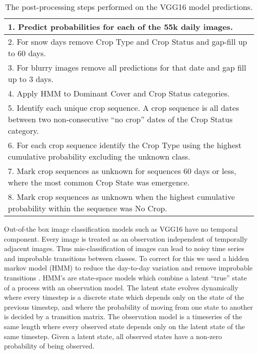 \documentclass[remotesensing,article,submit,moreauthors,pdftex]{Definitions/mdpi}
\begin{document}
\begin{table}[H]
\caption{The post-processing steps performed on the VGG16 model predictions.}
\centering
\begin{tabular}{|p{12cm}|}
\hline
1. Predict probabilities for each of the 55k daily images.                                                                                   \\ \hline
2. For snow days remove Crop Type and Crop Status and gap-fill up to 60 days.                                                                \\ \hline
3. For blurry images remove all predictions for that date and gap fill up to 3 days.                                                         \\ \hline
4. Apply HMM to Dominant Cover and Crop Status categories.                                                                                   \\ \hline
5. Identify each unique crop sequence. A crop sequence is all dates between two non-consecutive “no crop” dates of the Crop Status category. \\ \hline
6. For each crop sequence identify the Crop Type using the highest cumulative probability excluding the unknown class.                       \\ \hline
7. Mark crop sequences as unknown for sequences 60 days or less, where the most common Crop State was emergence.                             \\ \hline
8. Mark crop sequences as unknown when the highest cumulative probability within the sequence was No Crop.                                   \\ \hline
\end{tabular}
\label{table2}
\end{table}

Out-of-the box image classification models such as VGG16 have no temporal component. Every image is treated as an observation independent of temporally adjacent images. Thus mis-classification of images can lead to noisy time series and improbable transitions between classes. To correct for this we used a hidden markov model (HMM) to reduce the day-to-day variation and remove improbable transitions \citep{esmael2012, wehmann2015}. HMM’s are state-space models which combine a latent “true” state of a process with an observation model. The latent state evolves dynamically where every timestep is a discrete state which depends only on the state of the previous timestep, and where the probability of moving from one state to another is decided by a transition matrix. The observation model is a timeseries of the same length where every observed state depends only on the latent state of the same timestep. Given a latent state, all observed states have a non-zero probability of being observed.
\end{document}
